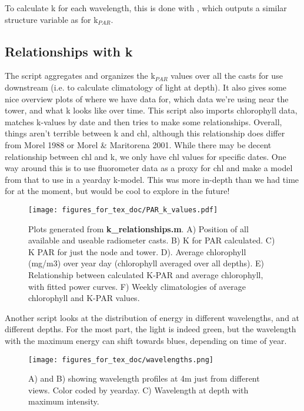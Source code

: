 \documentclass[11pt]{article}
\begin{document}
To calculate k for each wavelength, this is done with , which outputs a similar structure variable as for k$_{PAR}$.





\subsection{Relationships with k}

The script  aggregates and organizes the k$_{PAR}$ values over all the casts for use downstream (i.e. to calculate climatology of light at depth). It also gives some nice overview plots of where we have data for, which data we're using near the tower, and what k looks like over time. This script also imports chlorophyll data, matches k-values by date and then tries to make some relationships. Overall, things aren't terrible between k and chl, although this relationship does differ from Morel 1988 or Morel \& Maritorena 2001. While there may be decent relationship between chl and k, we only have chl values for specific dates. One way around this is to use fluorometer data as a proxy for chl and make a model from that to use in a yearday k-model. This was more in-depth than we had time for at the moment, but would be cool to explore in the future!

 
 \begin{figure}[h]
\centering
\texttt{[image: figures\_for\_tex\_doc/PAR\_k\_values.pdf]}
\caption{Plots generated from \textbf{k\_relationships.m}. A) Position of all available and useable radiometer casts. B) K for PAR calculated. C) K PAR for just the node and tower. D). Average chlorophyll (mg/m3) over year day (chlorophyll averaged over all depths). E) Relationship between calculated K-PAR and average chlorophyll, with fitted power curves. F) Weekly climatologies of average chlorophyll and K-PAR values.}
\end{figure}

\clearpage

Another script  looks at the distribution of energy in different wavelengths, and at different depths. For the most part, the light is indeed green, but the wavelength with the maximum energy can shift towards blues, depending on time of year. 

 \begin{figure}[h]
\centering
\texttt{[image: figures\_for\_tex\_doc/wavelengths.png]}
\caption{A) and B) showing wavelength profiles at 4m just from different views. Color coded by yearday. C) Wavelength at depth with maximum intensity.}
\end{figure}
\end{document}
